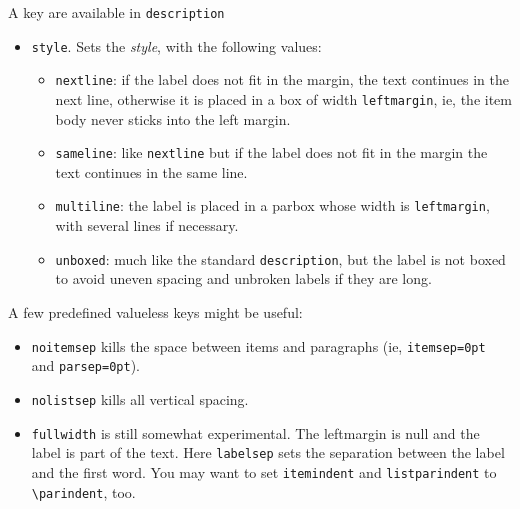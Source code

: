 \documentclass{article}
\begin{document}
A key are available in \verb|description|
\begin{itemize}
\item \verb|style|. Sets the \textit{style}, with the
following values:
\begin{itemize}

\item \verb|nextline|: if the label does not fit in the margin, the 
text continues in the next line, otherwise it is placed in a box of 
width \verb|leftmargin|, ie, the item body never sticks into the left 
margin. 

\item \verb|sameline|: like \verb|nextline| but if the label does not 
fit in the margin the text continues in the same line.

\item \verb|multiline|: the label is placed in a parbox whose width is 
\verb|leftmargin|, with several lines if necessary.

\item \verb|unboxed|: much like the standard \verb|description|, but 
the label is not boxed to avoid uneven spacing and unbroken labels if 
they are long.
\end{itemize}
\end{itemize} 

A few predefined valueless keys might be useful:
\begin{itemize}
\item \verb|noitemsep| kills the space between items
and paragraphs (ie, \verb|itemsep=0pt| and \verb|parsep=0pt|).
\item \verb|nolistsep| kills all vertical spacing.
\item \verb|fullwidth| is still somewhat experimental. The
leftmargin is null and the label is part of the text. Here
\verb|labelsep| sets the separation between the label and the first
word.
You may want to set \verb|itemindent| and \verb|listparindent|
to \verb|\parindent|, too.
\end{itemize}

\end{document}
